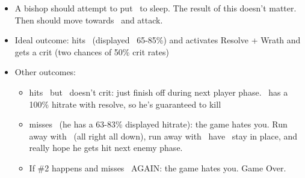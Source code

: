 \begin{tcolorbox}[title=\begin{center}Endgame - Repatriation\end{center},colbacktitle=blue!50!white]
\begin{itemize}
    \item A bishop should attempt to put \marcia\ to sleep. The result of this doesn’t matter.
    Then  should move towards \ike\ and attack.
    \vspace{2mm}
    \item Ideal outcome:  hits \ike\ (displayed ~65-85\%) and activates Resolve + Wrath and gets a crit (two chances of 50\% crit rates)

    \item Other outcomes:
    \begin{itemize}
        \item {} hits \ike\, but \ike\ doesn’t crit: just finish off  during next player phase. \ike\ has a 100\% hitrate with resolve, so he’s guaranteed to kill 
        \item {} misses \ike\ (he has a 63-83\% displayed hitrate): the game hates you. Run away with \marcia\ (all right all down), run away with \elincia\, have \ike\ stay in place, and really hope he gets hit next enemy phase.
        \item If \#2 happens and  misses \ike\ AGAIN: the game hates you. Game Over.
    \end{itemize}
\end{itemize}
\end{tcolorbox}
